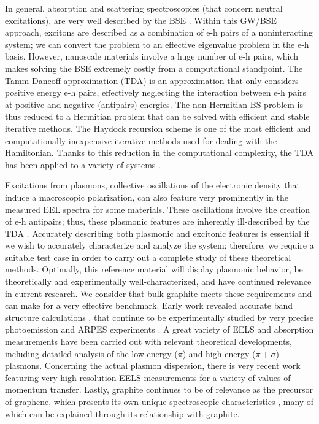 \documentclass[aps,prb,10pt,showpacs,superscriptaddress,twocolumn,notitlepage]{revtex4-1}
\begin{document}
In general, absorption and scattering spectroscopies (that concern neutral
excitations), are very well described by the BSE \cite{onidaPRL95, albrechtPRL98,
benedictPRB98, rohlfingPRL98b, onidaRMP02}. Within this GW/BSE approach,
excitons are described as a combination of e-h pairs of a noninteracting system;
we can convert the problem to an effective eigenvalue problem in the e-h basis.
However, nanoscale materials involve a huge number of e-h pairs, which makes
solving the BSE extremely costly from a computational standpoint. The
Tamm-Dancoff approximation (TDA) \cite{fetterbook72} is an approximation that
only considers positive energy e-h pairs, effectively neglecting the interaction
between e-h pairs at positive and negative (antipairs) energies. The
non-Hermitian BS problem is thus reduced to a Hermitian problem that can be
solved with efficient and stable iterative methods. The Haydock recursion scheme
\cite{haydockJPC72, haydockCPC80, roccaJCP08} is one of the most efficient and
computationally inexpensive iterative methods used for dealing with the
Hamiltonian. Thanks to this reduction in the computational complexity, the TDA
has been applied to a variety of systems \cite{lopezPRL06, arnaudPRL06,
wirtzPRL06}.

Excitations from plasmons, collective oscillations of the electronic density
that induce a macroscopic polarization, can also feature very prominently in the
measured EEL spectra for some materials. These oscillations involve the creation
of e-h antipairs; thus, these plasmonic features are inherently ill-described by
the TDA \cite{zimmermannPSSB70, caliebePRL00, olevanoPRL01, gruningNL09}.
Accurately describing both plasmonic and excitonic features is essential if we
wish to accurately characterize and analyze the system; therefore, we require a
suitable test case in order to carry out a complete study of these theoretical
methods. Optimally, this reference material will display plasmonic behavior, be
theoretically and experimentally well-characterized, and have continued
relevance in current research. We consider that bulk graphite meets these
requirements and can make for a very effective benchmark. Early work revealed
accurate band structure calculations \cite{bassaniINCB1967, painterPRB70}, that
continue to be experimentally studied by very precise photoemission and ARPES
experiments \cite{gruneisPRL08, matsuiPRB18}. A great variety of EELS
\cite{taftPR65, zeppenfeldZP71, venghausPSSB1974, buchnerPSSB77,
marinopoulosPRL02, krambergerPRL08} and absorption \cite{linPRB97,
krambergerPRL08, trevisanuttoPRB10} measurements have been carried out with
relevant theoretical developments, including detailed analysis of the low-energy
($\pi$) and high-energy ($\pi + \sigma$) plasmons. Concerning the actual plasmon
dispersion, there is very recent work \cite{kinyanjuiEPL12, liouPRB15} featuring
very high-resolution EELS measurements for a variety of values of momentum
transfer. Lastly, graphite continues to be of relevance as the precursor of
graphene, which presents its own unique spectroscopic characteristics
\cite{yangPRL09, tegenkampJPCM11, politanoNS14, liouPRB15, bulushevaIJQC16,
liPRB17}, many of which can be explained through its relationship with graphite.
\end{document}

